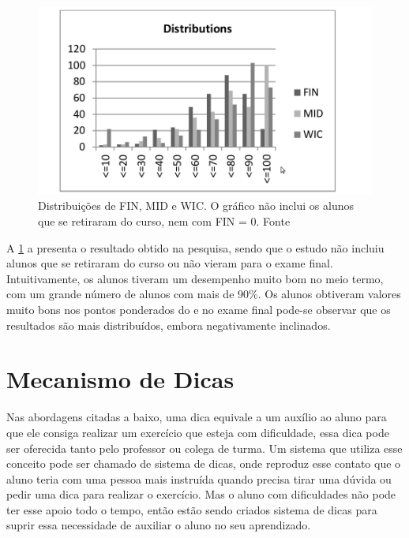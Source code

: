 \begin{figure}[]
	\centering
	\captionsetup{justification=centering}
	\includegraphics[width=.8\linewidth]{referencialteorico/cukierman.png}
	\caption{Distribuições de FIN, MID e WIC. O gráfico não inclui os alunos que se retiraram do curso, nem com FIN = 0. Fonte \cite{Cukierman:2015:PSU:2729094.2742623}}
	\label{figura:resultadoCukierman}
\end{figure}

A \cref{figura:resultadoCukierman} a presenta o resultado obtido na pesquisa, sendo que o estudo não incluiu alunos que se retiraram do curso ou não vieram para o exame final. Intuitivamente, os alunos tiveram um desempenho muito bom no meio termo, com um grande número de alunos com mais de 90\%. Os alunos obtiveram valores muito bons nos pontos ponderados do  e no exame final pode-se observar que os resultados são mais distribuídos, embora negativamente inclinados.


\section{Mecanismo de Dicas}

Nas abordagens citadas a baixo, uma dica equivale a um auxílio ao aluno para que ele consiga realizar um exercício que esteja com dificuldade, essa dica pode ser oferecida tanto pelo professor ou colega de turma. Um sistema que utiliza esse conceito pode ser chamado de sistema de dicas, onde reproduz esse contato que o aluno teria com uma pessoa mais instruída quando precisa tirar uma dúvida ou pedir uma dica para realizar o exercício. Mas o aluno com dificuldades não pode ter esse apoio todo o tempo, então estão sendo criados sistema de dicas para suprir essa necessidade de auxiliar o aluno no seu aprendizado.

